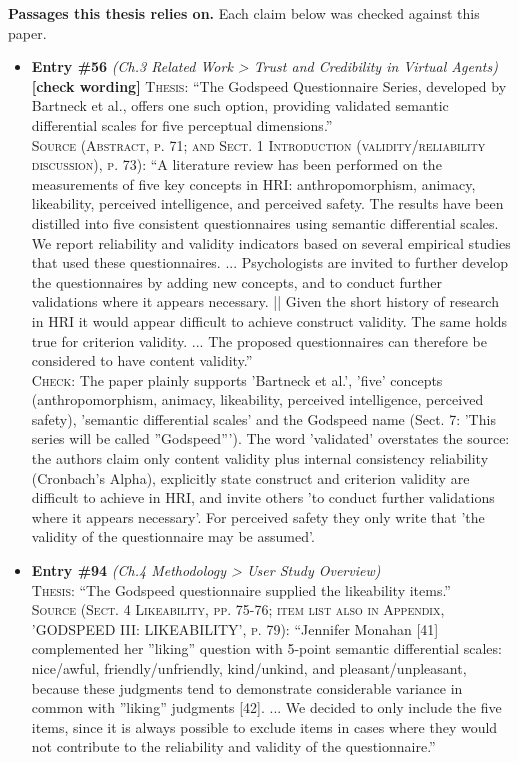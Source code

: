 \documentclass[11pt, a4paper]{article}
\begin{document}
\textbf{Passages this thesis relies on.} Each claim below was checked against this paper.
\begin{itemize}[leftmargin=1.2em,itemsep=4pt]
\item \textbf{Entry \#56} \textit{(Ch.3 Related Work > Trust and Credibility in Virtual Agents)}\\
\textcolor{partialorange}{\textbf{[check wording]}} \textsc{Thesis:} ``The Godspeed Questionnaire Series, developed by Bartneck et al., offers one such option, providing validated semantic differential scales for five perceptual dimensions.''\\
\textsc{Source (Abstract, p. 71; and Sect. 1 Introduction (validity/reliability discussion), p. 73):} ``A literature review has been performed on the measurements of five key concepts in HRI: anthropomorphism, animacy, likeability, perceived intelligence, and perceived safety. The results have been distilled into five consistent questionnaires using semantic differential scales. We report reliability and validity indicators based on several empirical studies that used these questionnaires. ... Psychologists are invited to further develop the questionnaires by adding new concepts, and to conduct further validations where it appears necessary. || Given the short history of research in HRI it would appear difficult to achieve construct validity. The same holds true for criterion validity. ... The proposed questionnaires can therefore be considered to have content validity.''\\
\textsc{Check:} The paper plainly supports 'Bartneck et al.', 'five' concepts (anthropomorphism, animacy, likeability, perceived intelligence, perceived safety), 'semantic differential scales' and the Godspeed name (Sect. 7: 'This series will be called ”Godspeed”'). The word 'validated' overstates the source: the authors claim only content validity plus internal consistency reliability (Cronbach's Alpha), explicitly state construct and criterion validity are difficult to achieve in HRI, and invite others 'to conduct further validations where it appears necessary'. For perceived safety they only write that 'the validity of the questionnaire may be assumed'.
\item \textbf{Entry \#94} \textit{(Ch.4 Methodology > User Study Overview)}\\
\textsc{Thesis:} ``The Godspeed questionnaire supplied the likeability items.''\\
\textsc{Source (Sect. 4 Likeability, pp. 75-76; item list also in Appendix, 'GODSPEED III: LIKEABILITY', p. 79):} ``Jennifer Monahan [41] complemented her ”liking” question with 5-point semantic differential scales: nice/awful, friendly/unfriendly, kind/unkind, and pleasant/unpleasant, because these judgments tend to demonstrate considerable variance in common with ”liking” judgments [42]. ... We decided to only include the five items, since it is always possible to exclude items in cases where they would not contribute to the reliability and validity of the questionnaire.''\\

\end{itemize}
\end{document}
